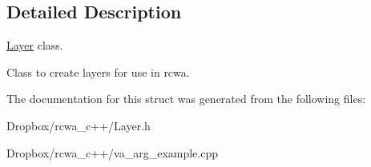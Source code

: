 \subsection{Detailed Description}
\hyperlink{class_layer}{Layer} class. 

Class to create layers for use in rcwa. 

The documentation for this struct was generated from the following files\+:\begin{DoxyCompactItemize}
\item 
Dropbox/rcwa\+\_\+c++/Layer.\+h\item 
Dropbox/rcwa\+\_\+c++/va\+\_\+arg\+\_\+example.\+cpp\end{DoxyCompactItemize}
